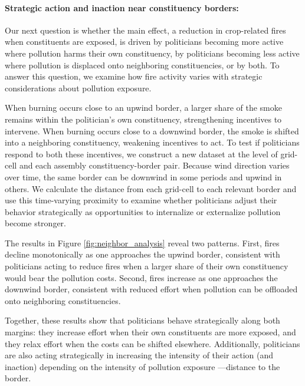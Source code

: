 \documentclass[12pt]{article}
\begin{document}
 \paragraph{Strategic action and inaction near constituency borders:}

Our next question is whether the main effect, a reduction in crop-related fires when constituents are exposed, is driven by politicians becoming more active where pollution harms their own constituency, by politicians becoming less active where pollution is displaced onto neighboring constituencies, or by both. To answer this question, we examine how fire activity varies with strategic considerations about pollution exposure.


When burning occurs close to an upwind border, a larger share of the smoke remains within the politician’s own constituency, strengthening incentives to intervene. When burning occurs close to a downwind border, the smoke is shifted into a neighboring constituency, weakening incentives to act.
To test if politicians respond to both these incentives, we construct a new dataset at the level of grid-cell and each assembly constituency-border pair. Because wind direction varies over time, the same border can be downwind in some periods and upwind in others. We calculate the distance from each grid-cell to each relevant border and use this time-varying proximity to examine whether politicians adjust their behavior strategically as opportunities to internalize or externalize pollution become stronger.


The results in Figure \ref{fig:neighbor_analysis} reveal two patterns. First, fires decline monotonically as one approaches the upwind border, consistent with politicians acting to reduce fires when a larger share of their own constituency would bear the pollution costs. Second, fires increase as one approaches the downwind border, consistent with reduced effort when pollution can be offloaded onto neighboring constituencies. 

Together, these results show that politicians behave strategically along both margins: they increase effort when their own constituents are more exposed, and they relax effort when the costs can be shifted elsewhere. Additionally, politicians are also acting strategically in increasing the intensity of their action (and inaction) depending on the intensity of pollution exposure ---distance to the border.

\end{document}
